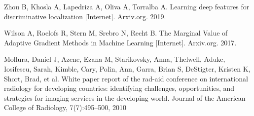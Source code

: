 \documentclass{amia}
\begin{document}
\begin{thebibliography}{1}
Zhou B, Khosla A, Lapedriza A, Oliva A, Torralba A. Learning deep features for discriminative localization [Internet]. Arxiv.org. 2019.

Wilson A, Roelofs R, Stern M, Srebro N, Recht B. The Marginal Value of Adaptive Gradient Methods in Machine Learning [Internet]. Arxiv.org. 2017.

Mollura, Daniel J, Azene, Ezana M, Starikovsky, Anna, Thelwell, Aduke, Iosifescu, Sarah, Kimble, Cary, Polin, Ann, Garra, Brian S, DeStigter, Kristen K, Short, Brad, et al. White paper report of the rad-aid conference on international radiology for developing countries: identifying challenges, opportunities, and strategies for imaging services in the developing world. Journal of the American College of Radiology, 7(7):495–500, 2010
\end{thebibliography}
\end{document}
